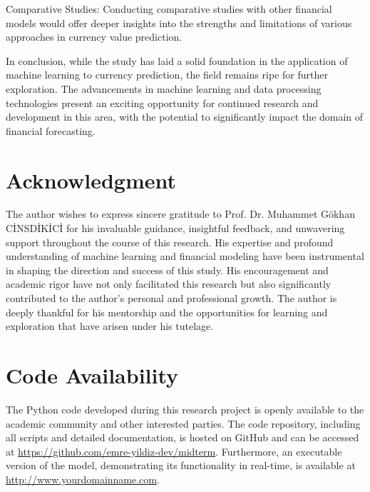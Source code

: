 \documentclass[conference]{IEEEtran}
\begin{document}
Comparative Studies: Conducting comparative studies with other financial models would offer deeper insights into the strengths and limitations of various approaches in currency value prediction.

In conclusion, while the study has laid a solid foundation in the application of machine learning to currency prediction, the field remains ripe for further exploration. The advancements in machine learning and data processing technologies present an exciting opportunity for continued research and development in this area, with the potential to significantly impact the domain of financial forecasting.

\section*{Acknowledgment}
The author wishes to express sincere gratitude to Prof. Dr. Muhammet Gökhan CİNSDİKİCİ for his invaluable guidance, insightful feedback, and unwavering support throughout the course of this research. His expertise and profound understanding of machine learning and financial modeling have been instrumental in shaping the direction and success of this study. His encouragement and academic rigor have not only facilitated this research but also significantly contributed to the author's personal and professional growth. The author is deeply thankful for his mentorship and the opportunities for learning and exploration that have arisen under his tutelage.

\section*{Code Availability}
The Python code developed during this research project is openly available to the academic community and other interested parties. The code repository, including all scripts and detailed documentation, is hosted on GitHub and can be accessed at \url{https://github.com/emre-yildiz-dev/midterm}. Furthermore, an executable version of the model, demonstrating its functionality in real-time, is available at \url{http://www.yourdomainname.com}.




\end{document}
